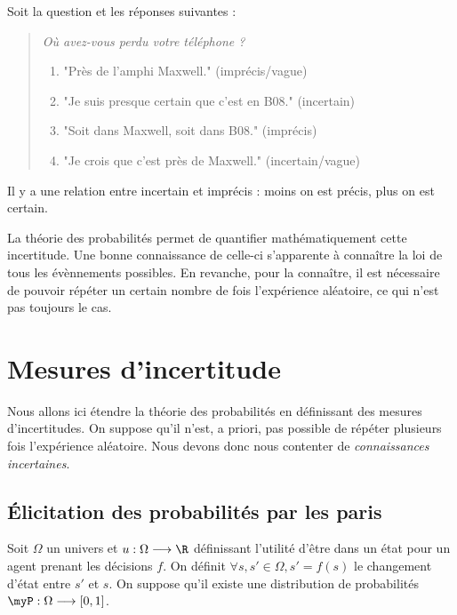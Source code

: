 \begin{example}
    Soit la question et les réponses suivantes : 
    \begin{quote}
        \emph{Où avez-vous perdu votre téléphone ? }

        \begin{enumerate}
            \item "Près de l'amphi Maxwell." (imprécis/vague)
            \item "Je suis presque certain que c'est en B08." (incertain)
            \item "Soit dans Maxwell, soit dans B08." (imprécis)
            \item "Je crois que c'est près de Maxwell." (incertain/vague)
        \end{enumerate}
    \end{quote}
\end{example}

Il y a une relation entre incertain et imprécis : moins on est précis, plus on est certain. 

\begin{remark}
    La théorie des probabilités permet de quantifier mathématiquement cette incertitude. 
    Une bonne connaissance de celle-ci s'apparente à connaître la loi de tous les évènnements possibles.
    En revanche, pour la connaître, il est nécessaire de pouvoir répéter un certain nombre de fois 
    l'expérience aléatoire, ce qui n'est pas toujours le cas. 
\end{remark}


\section{Mesures d'incertitude}

Nous allons ici étendre la théorie des probabilités en définissant des mesures d'incertitudes. 
On suppose qu'il n'est, a priori, pas possible de répéter plusieurs fois l'expérience aléatoire. 
Nous devons donc nous contenter de \emph{connaissances incertaines}.

\subsection{Élicitation des probabilités par les paris}

Soit $ \Omega$ un univers et $ u : \Omega \longrightarrow \R$ définissant l'utilité d'être dans un 
état pour un agent prenant les décisions $f$. On définit $ \forall s, s' \in \Omega, s' = f(s)$ le changement 
d'état entre $s'$ et $s$. On suppose qu'il existe une distribution de probabilités 
$ \myP : \Omega \longrightarrow [0,1]$. 

